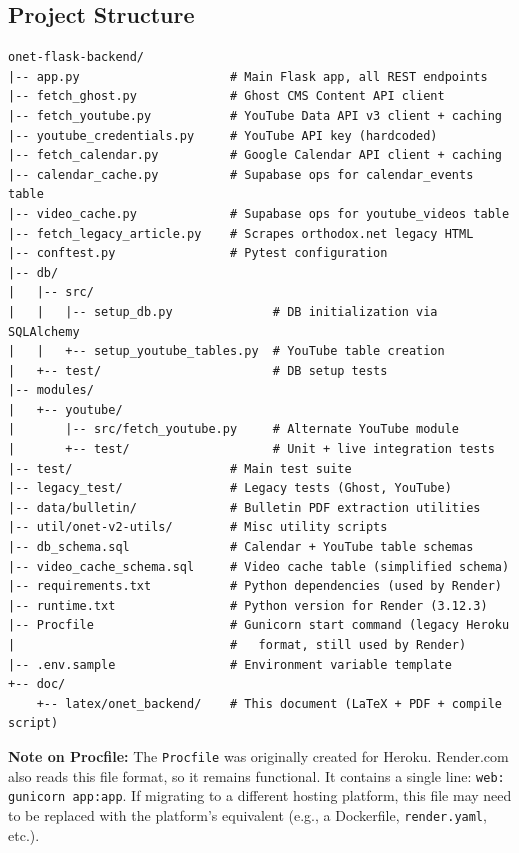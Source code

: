 \documentclass[12pt]{article}
\begin{document}
\clearpage
\subsection{Project Structure}
\begin{lstlisting}[language={}, basicstyle=\ttfamily\footnotesize, frame=none, numbers=none]
onet-flask-backend/
|-- app.py                     # Main Flask app, all REST endpoints
|-- fetch_ghost.py             # Ghost CMS Content API client
|-- fetch_youtube.py           # YouTube Data API v3 client + caching
|-- youtube_credentials.py     # YouTube API key (hardcoded)
|-- fetch_calendar.py          # Google Calendar API client + caching
|-- calendar_cache.py          # Supabase ops for calendar_events table
|-- video_cache.py             # Supabase ops for youtube_videos table
|-- fetch_legacy_article.py    # Scrapes orthodox.net legacy HTML
|-- conftest.py                # Pytest configuration
|-- db/
|   |-- src/
|   |   |-- setup_db.py              # DB initialization via SQLAlchemy
|   |   +-- setup_youtube_tables.py  # YouTube table creation
|   +-- test/                        # DB setup tests
|-- modules/
|   +-- youtube/
|       |-- src/fetch_youtube.py     # Alternate YouTube module
|       +-- test/                    # Unit + live integration tests
|-- test/                      # Main test suite
|-- legacy_test/               # Legacy tests (Ghost, YouTube)
|-- data/bulletin/             # Bulletin PDF extraction utilities
|-- util/onet-v2-utils/        # Misc utility scripts
|-- db_schema.sql              # Calendar + YouTube table schemas
|-- video_cache_schema.sql     # Video cache table (simplified schema)
|-- requirements.txt           # Python dependencies (used by Render)
|-- runtime.txt                # Python version for Render (3.12.3)
|-- Procfile                   # Gunicorn start command (legacy Heroku
|                              #   format, still used by Render)
|-- .env.sample                # Environment variable template
+-- doc/
    +-- latex/onet_backend/    # This document (LaTeX + PDF + compile script)
\end{lstlisting}

\textbf{Note on Procfile:} The \texttt{Procfile} was originally created for Heroku. Render.com also reads this file format, so it remains functional. It contains a single line: \texttt{web: gunicorn app:app}. If migrating to a different hosting platform, this file may need to be replaced with the platform's equivalent (e.g., a Dockerfile, \texttt{render.yaml}, etc.).
\end{document}
